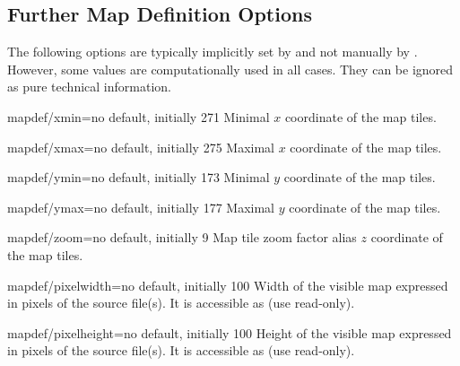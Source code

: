 \subsection{Further Map Definition Options}


The following options are typically implicitly set by 
and not manually by . However, some values are
computationally used in all cases. They can be ignored as pure technical
information.

\begin{docMrcKey}{mapdef/xmin}{=}{no default, initially 271}
  Minimal $x$ coordinate of the map tiles.
\end{docMrcKey}

\begin{docMrcKey}{mapdef/xmax}{=}{no default, initially 275}
  Maximal $x$ coordinate of the map tiles.
\end{docMrcKey}

\begin{docMrcKey}{mapdef/ymin}{=}{no default, initially 173}
  Minimal $y$ coordinate of the map tiles.
\end{docMrcKey}

\begin{docMrcKey}{mapdef/ymax}{=}{no default, initially 177}
  Maximal $y$ coordinate of the map tiles.
\end{docMrcKey}

\begin{docMrcKey}{mapdef/zoom}{=}{no default, initially 9}
  Map tile zoom factor alias $z$ coordinate of the map tiles.
\end{docMrcKey}

\begin{docMrcKey}{mapdef/pixelwidth}{=}{no default, initially 100}
  Width of the visible map expressed in pixels of the source file(s).
  It is accessible as  (use read-only).
\end{docMrcKey}

\begin{docMrcKey}{mapdef/pixelheight}{=}{no default, initially 100}
  Height of the visible map expressed in pixels of the source file(s).
  It is accessible as  (use read-only).
\end{docMrcKey}

